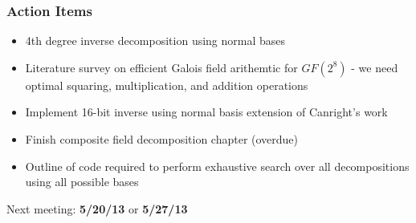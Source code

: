\documentclass[handout]{beamer}
\begin{document}
\begin{frame}
	\frametitle{Action Items}
	\begin{itemize}
		\item 4th degree inverse decomposition using normal bases
		\item Literature survey on efficient Galois field arithemtic for $GF(2^8)$ - we need optimal squaring, multiplication, and addition operations
		\item Implement 16-bit inverse using normal basis extension of Canright's work
		\item Finish composite field decomposition chapter (overdue)
		\item Outline of code required to perform exhaustive search over all decompositions using all possible bases
	\end{itemize}
	\begin{center}
		Next meeting: \textbf{5/20/13} or \textbf{5/27/13}
	\end{center}
\end{frame}
\end{document}
